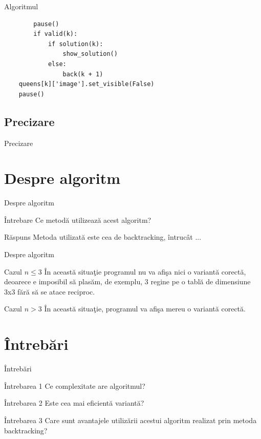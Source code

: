 \documentclass{beamer}
\begin{document}
\begin{frame}[fragile]{Algoritmul}
    \begin{lstlisting}
        pause()
        if valid(k):
            if solution(k):
                show_solution()
            else:
                back(k + 1)
    queens[k]['image'].set_visible(False)
    pause()
    \end{lstlisting}

    \subsection{Precizare}
    \begin{block}{Precizare}
        \lipsum[1][3-5]
    \end{block}
\end{frame}

\section{Despre algoritm}
\begin{frame}{Despre algoritm}
    \begin{exampleblock} {\^Intrebare}
        Ce metod\u a utilizeaz\u a acest algoritm?
    \end{exampleblock}
    \begin{block} {R\u aspuns}
        Metoda utilizat\u a este cea de backtracking, \^intruc\^at ...
        \lipsum[1][1-6]
    \end{block}
\end{frame}

\begin{frame}{Despre algoritm}
    \begin{block}{Cazul \(n \leq 3 \)}
        \^ In aceast\u a situa\c tie programul nu va
        afi\c sa nici o variant\u a corect\u a, deoarece e imposibil
        s\u a plas\u am, de exemplu, 3 regine pe o tabl\u a de dimensiune 3x3 f\u ar\u a 
        s\u a se atace reciproc.
    \end{block}
    \begin{block}{Cazul \(n>3\)}
        \^In aceast\u a situa\c tie, programul va afi\c sa mereu o
        variant\u a corect\u a.        
    \end{block}
\end{frame}

\section{\^ Intreb\u ari}
\begin{frame}{\^ Intreb\u ari}
    \begin{exampleblock} {\^Intrebarea 1}
        Ce complexitate are algoritmul?
    \end{exampleblock}
    \begin{exampleblock} {\^Intrebarea 2}
        Este cea mai eficient\u a variant\u a?
    \end{exampleblock}
    \begin{exampleblock} {\^Intrebarea 3}
        Care sunt avantajele utiliz\u arii acestui algoritm 
        realizat prin metoda backtracking?
    \end{exampleblock}
\end{frame}
\end{document}
